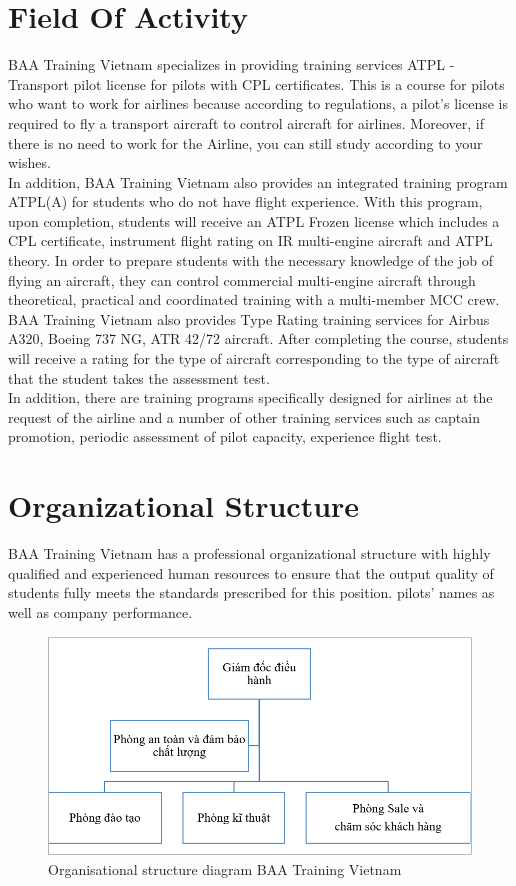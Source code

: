 \section{Field Of Activity}
    BAA Training Vietnam specializes in providing training services ATPL - Transport pilot license for pilots with CPL certificates. 
    This is a course for pilots who want to work for airlines because according to regulations, a pilot's license is required to fly 
    a transport aircraft to control aircraft for airlines. Moreover, if there is no need to work for the Airline, you can still study 
    according to your wishes. \\ 
    \vspace{3mm}
    In addition, BAA Training Vietnam also provides an integrated training program ATPL(A) for students who do not have flight experience. 
    With this program, upon completion, students will receive an ATPL Frozen license which includes a CPL certificate, instrument flight rating 
    on IR multi-engine aircraft and ATPL theory. In order to prepare students with the necessary knowledge of the job of flying an aircraft, 
    they can control commercial multi-engine aircraft through theoretical, practical and coordinated training with a multi-member MCC crew. \\ 
    \vspace{3mm}
    BAA Training Vietnam also provides Type Rating training services for Airbus A320, Boeing 737 NG, ATR 42/72 aircraft. After completing the 
    course, students will receive a rating for the type of aircraft corresponding to the type of aircraft that the student takes the assessment test. \\ 
    \vspace{3mm}
    In addition, there are training programs specifically designed for airlines at the request of the airline and a number of other training 
    services such as captain promotion, periodic assessment of pilot capacity, experience flight test.

\section{Organizational Structure}
    BAA Training Vietnam has a professional organizational structure with highly qualified and experienced human resources to ensure that the output 
    quality of students fully meets the standards prescribed for this position. pilots' names as well as company performance.
    \begin{figure}[H]
        \centering
        \includegraphics[width=0.6\linewidth]{img/structure.PNG}
        \caption{Organisational structure diagram BAA Training Vietnam}
    \end{figure}
